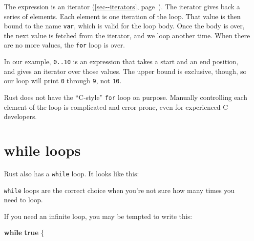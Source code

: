 \documentclass[a4paper,]{book}
\renewcommand*{\hyperref}[2][\ar]{%
  \def\ar{#2}%
  #2 (\autoref{#1}, page~\pageref{#1})}
\newenvironment{Shaded}{\begin{snugshade}}{\end{snugshade}}
\newcommand{\KeywordTok}[1]{\textcolor[rgb]{0.13,0.29,0.53}{\textbf{{#1}}}}
\newcommand{\DecValTok}[1]{\textcolor[rgb]{0.00,0.00,0.81}{{#1}}}
\newcommand{\StringTok}[1]{\textcolor[rgb]{0.31,0.60,0.02}{{#1}}}
\newcommand{\CommentTok}[1]{\textcolor[rgb]{0.56,0.35,0.01}{\textit{{#1}}}}
\newcommand{\OtherTok}[1]{\textcolor[rgb]{0.56,0.35,0.01}{{#1}}}
\newcommand{\NormalTok}[1]{{#1}}
\begin{document}
The expression is an \hyperref[sec--iterators]{iterator}. The iterator
gives back a series of elements. Each element is one iteration of the
loop. That value is then bound to the name \texttt{var}, which is valid
for the loop body. Once the body is over, the next value is fetched from
the iterator, and we loop another time. When there are no more values,
the \texttt{for} loop is over.

In our example, \texttt{0..10} is an expression that takes a start and
an end position, and gives an iterator over those values. The upper
bound is exclusive, though, so our loop will print \texttt{0} through
\texttt{9}, not \texttt{10}.

Rust does not have the ``C-style'' \texttt{for} loop on purpose.
Manually controlling each element of the loop is complicated and error
prone, even for experienced C developers.

\section{while loops}\label{sec--while-loops}

Rust also has a \texttt{while} loop. It looks like this:

\begin{Shaded}
\end{Shaded}

\texttt{while} loops are the correct choice when you're not sure how
many times you need to loop.

If you need an infinite loop, you may be tempted to write this:

\begin{Shaded}
\begin{Highlighting}[]
\KeywordTok{while} \KeywordTok{true} \NormalTok{\{}
\end{Highlighting}
\end{Shaded}
\end{document}
